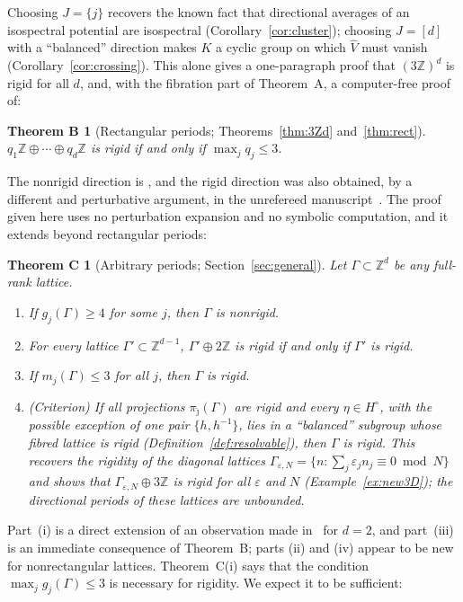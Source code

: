 \documentclass[11pt,reqno]{amsart}
\newtheorem*{theoremB}{Theorem B}
\newtheorem*{theoremC}{Theorem C}
\theoremstyle{definition}
\theoremstyle{remark}
\newcommand{\Z}{\mathbb Z}
\begin{document}
Choosing $J=\{j\}$ recovers the known fact that directional averages of an
isospectral potential are isospectral (Corollary~\ref{cor:cluster});
choosing $J=[d]$ with a ``balanced'' direction makes $K$ a cyclic group on
which $\widehat V$ must vanish (Corollary~\ref{cor:crossing}).  This alone
gives a one-paragraph proof that $(3\Z)^d$ is rigid for all $d$, and, with the
fibration part of Theorem~A, a computer-free proof of:

\begin{theoremB}[Rectangular periods; Theorems~\ref{thm:3Zd} and~\ref{thm:rect}]
$q_1\Z\oplus\cdots\oplus q_d\Z$ is rigid if and only if $\max_jq_j\le3$.
\end{theoremB}

The nonrigid direction is \cite[Theorem~C]{CFK2026}, and the rigid direction
was also obtained, by a different and perturbative argument, in the
unrefereed manuscript~\cite{KeioGPT}.  The proof given here uses no
perturbation expansion and no symbolic computation, and it extends beyond
rectangular periods:

\begin{theoremC}[Arbitrary periods; Section~\ref{sec:general}]
Let $\Gamma\subset\Z^d$ be any full-rank lattice.
\begin{enumerate}[label=\textup{(\roman*)}]
\item If $g_j(\Gamma)\ge4$ for some $j$, then $\Gamma$ is nonrigid.
\item For every lattice $\Gamma'\subset\Z^{d-1}$, $\Gamma'\oplus2\Z$ is rigid if and only if $\Gamma'$ is rigid.
\item If $m_j(\Gamma)\le3$ for all $j$, then $\Gamma$ is rigid.
\item \textup{(Criterion)} If all projections $\pi_{\hat\jmath}(\Gamma)$ are rigid and every
$\eta\in H^\circ$, with the possible exception of one pair $\{h,h^{-1}\}$, lies
in a ``balanced'' subgroup whose fibred lattice is rigid (Definition~\ref{def:resolvable}),
then $\Gamma$ is rigid.  This recovers the rigidity of the diagonal lattices
$\Gamma_{\varepsilon,N}=\{n:\sum_j\varepsilon_jn_j\equiv0\bmod N\}$
\cite[Theorem~6.1]{FFORS2026} and shows that $\Gamma_{\varepsilon,N}\oplus3\Z$
is rigid for all $\varepsilon$ and $N$ (Example~\ref{ex:new3D}); the
directional periods of these lattices are unbounded.
\end{enumerate}
\end{theoremC}

Part~(i) is a direct extension of an observation made in~\cite[Section~6]{FFORS2026}
for $d=2$, and part~(iii) is an immediate consequence of Theorem~B; parts (ii)
and (iv) appear to be new for nonrectangular lattices.
Theorem~C(i) says that the condition $\max_jg_j(\Gamma)\le3$ is necessary for
rigidity.  We expect it to be sufficient:
\end{document}
